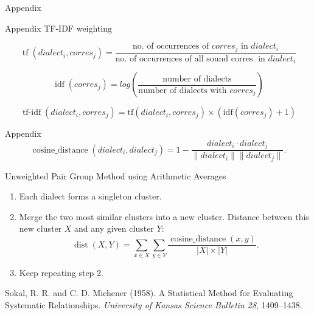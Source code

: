 \documentclass[xcolor={dvipsnames}]{beamer}
\begin{document}
\begin{frame}{Appendix}

\end{frame}

\begin{frame}{Appendix}
TF-IDF weighting

\begin{equation*}
\operatorname{tf}(dialect_i, corres_j) =
\frac{\text{no. of occurrences of } corres_j \text{ in } dialect_i}
{\text{no. of occurrences of all sound corres. in } dialect_i}
\end{equation*}

\begin{equation*}
\operatorname{idf}(corres_j) =
log(
\frac{\text{number of dialects}}
{\text{number of dialects with } corres_j}
)
\end{equation*}

\begin{equation*}
\operatorname{tf-idf}(dialect_i, corres_j) =
\text{tf}(dialect_i, corres_j)
\times
(
\text{idf}(corres_j)
+ 1)
\end{equation*}
\end{frame}

\begin{frame}{Appendix}
\begin{equation*}
\operatorname{cosine\_distance}(dialect_i,dialect_j) =
1 -
\frac{dialect_i \cdot dialect_j}{\lVert dialect_i \rVert \lVert dialect_j \rVert}
.
\end{equation*}

\vspace{1.5em}
Unweighted Pair Group Method using Arithmetic Averages
\begin{enumerate}
\item
Each dialect forms a singleton cluster.

\item
Merge the two most similar clusters into a new cluster.
Distance between this new cluster $X$ and any given cluster $Y$:
\begin{equation*}
\operatorname{dist}(X, Y) =
\sum_{x \in X}
\sum_{y \in Y}
\frac{
\operatorname{cosine\_distance}(x, y)
}
{
|X| \times |Y|
}
.
\end{equation*}

\item
Keep repeating step 2.
\end{enumerate}

{\small
Sokal, R. R. and C. D. Michener (1958). A Statistical Method for Evaluating Systematic Relationships.
\textit{University of Kansas Science Bulletin 28}, 1409–1438.}
\end{frame}
\end{document}

